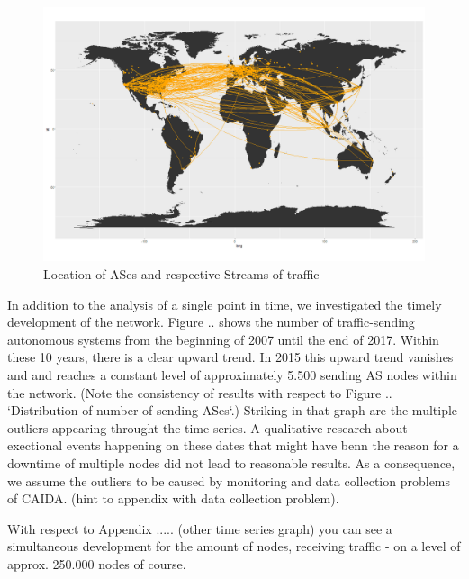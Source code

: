 \documentclass[conference]{IEEEtran}
\begin{document}
\begin{figure}[htbp]
\centerline{\includegraphics[scale=0.2]{Graphics/connectedASes.png}}
\caption{Location of ASes and respective Streams of traffic}
\label{fig}
\end{figure}

In addition to the analysis of a single point in time, we investigated the timely development of the network. Figure .. shows the number of traffic-sending autonomous systems from the beginning of 2007 until the end of 2017. Within these 10 years, there is a clear upward trend. In 2015 this upward trend vanishes and and reaches a constant level of approximately 5.500 sending AS nodes within the network. (Note the consistency of results with respect to Figure .. `Distribution of number of sending ASes`.) Striking in that graph are the multiple outliers appearing throught the time series. A qualitative research about exectional events happening on these dates that might have benn the reason for a downtime of multiple nodes did not lead to reasonable results. As a consequence, we assume the outliers to be caused by monitoring and data collection problems of CAIDA. (hint to appendix with data collection problem).

With respect to Appendix ..... (other time series graph) you can see a simultaneous development for the amount of nodes, receiving traffic - on a level of approx. 250.000 nodes of course. 
\end{document}
